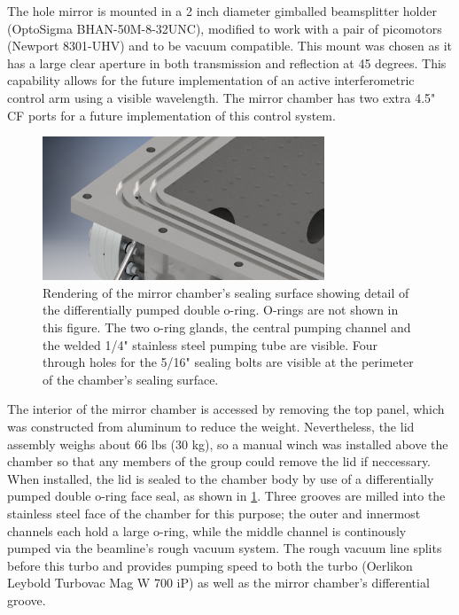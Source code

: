 The hole mirror is mounted in a 2 inch diameter gimballed beamsplitter holder (OptoSigma BHAN-50M-8-32UNC), modified to work with a pair of picomotors (Newport 8301-UHV) and to be vacuum compatible. This mount was chosen as it has a large clear aperture in both transmission and reflection at 45 degrees. This capability allows for the future implementation of an active interferometric control arm using a visible wavelength. The mirror chamber has two extra 4.5" CF ports for a future implementation of this control system.

\begin{figure}
	\centering
	\includegraphics[width=0.75\textwidth]{figures/chap2/mirror_chamber-diff_pump_groove.png}
	\caption{Rendering of the mirror chamber's sealing surface showing detail of the differentially pumped double o-ring. O-rings are not shown in this figure. The two o-ring glands, the central pumping channel and the welded 1/4" stainless steel pumping tube are visible. Four through holes for the 5/16" sealing bolts are visible at the perimeter of the chamber's sealing surface.}
	\label{fig:mirror_chamber_diff_pump_groove}
\end{figure}

The interior of the mirror chamber is accessed by removing the top panel, which was constructed from aluminum to reduce the weight. Nevertheless, the lid assembly weighs about 66 lbs (30 kg), so a manual winch was installed above the chamber so that any members of the group could remove the lid if neccessary. When installed, the lid is sealed to the chamber body by use of a differentially pumped double o-ring face seal, as shown in \cref{fig:mirror_chamber_diff_pump_groove}. Three grooves are milled into the stainless steel face of the chamber for this purpose; the outer and innermost channels each hold a large o-ring, while the middle channel is continously pumped via the beamline's rough vacuum system. The rough vacuum line splits before this turbo and provides pumping speed to both the turbo (Oerlikon Leybold Turbovac Mag W 700 iP) as well as the mirror chamber's differential groove.

